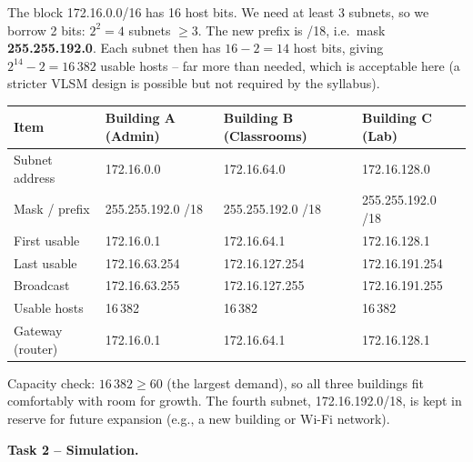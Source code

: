 \documentclass[11pt]{article}
\newcommand{\cle}[1]{{\popxbold\color{popdark}#1}}
\begin{document}
The block 172.16.0.0/16 has 16 host bits. We need at least 3 subnets, so we borrow \cle{2 bits}: $2^2 = 4$ subnets $\ge 3$. The new prefix is /18, i.e.\ mask \textbf{255.255.192.0}. Each subnet then has $16-2 = 14$ host bits, giving $2^{14} - 2 = 16\,382$ usable hosts -- far more than needed, which is acceptable here (a stricter VLSM design is possible but not required by the syllabus).

\begin{center}
\begin{tabularx}{\linewidth}{|l|X|X|X|}
\hline
\rowcolor{popblueL} \textbf{Item} & \textbf{Building A (Admin)} & \textbf{Building B (Classrooms)} & \textbf{Building C (Lab)} \\
\hline
Subnet address & 172.16.0.0 & 172.16.64.0 & 172.16.128.0 \\
\hline
Mask / prefix & 255.255.192.0 /18 & 255.255.192.0 /18 & 255.255.192.0 /18 \\
\hline
First usable & 172.16.0.1 & 172.16.64.1 & 172.16.128.1 \\
\hline
Last usable & 172.16.63.254 & 172.16.127.254 & 172.16.191.254 \\
\hline
Broadcast & 172.16.63.255 & 172.16.127.255 & 172.16.191.255 \\
\hline
Usable hosts & 16\,382 & 16\,382 & 16\,382 \\
\hline
Gateway (router) & 172.16.0.1 & 172.16.64.1 & 172.16.128.1 \\
\hline
\end{tabularx}
\end{center}

Capacity check: $16\,382 \ge 60$ (the largest demand), so all three buildings fit comfortably with room for growth. The fourth subnet, 172.16.192.0/18, is kept in reserve for future expansion (e.g., a new building or Wi-Fi network).

\textbf{Task 2 -- Simulation.}
\end{document}
